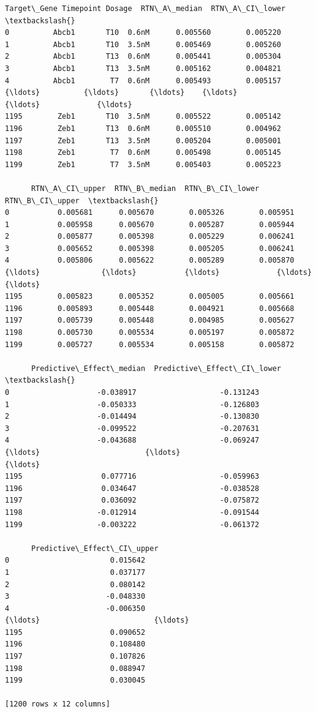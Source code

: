 \documentclass[11pt]{article}
\begin{document}
    
    \begin{Verbatim}[commandchars=\\\{\}]
     Target\_Gene Timepoint Dosage  RTN\_A\_median  RTN\_A\_CI\_lower  \textbackslash{}
0          Abcb1       T10  0.6nM      0.005560        0.005220   
1          Abcb1       T10  3.5nM      0.005469        0.005260   
2          Abcb1       T13  0.6nM      0.005441        0.005304   
3          Abcb1       T13  3.5nM      0.005162        0.004821   
4          Abcb1        T7  0.6nM      0.005493        0.005157   
{\ldots}          {\ldots}       {\ldots}    {\ldots}           {\ldots}             {\ldots}   
1195        Zeb1       T10  3.5nM      0.005522        0.005142   
1196        Zeb1       T13  0.6nM      0.005510        0.004962   
1197        Zeb1       T13  3.5nM      0.005204        0.005001   
1198        Zeb1        T7  0.6nM      0.005498        0.005145   
1199        Zeb1        T7  3.5nM      0.005403        0.005223   

      RTN\_A\_CI\_upper  RTN\_B\_median  RTN\_B\_CI\_lower  RTN\_B\_CI\_upper  \textbackslash{}
0           0.005681      0.005670        0.005326        0.005951   
1           0.005958      0.005670        0.005287        0.005944   
2           0.005877      0.005398        0.005229        0.006241   
3           0.005652      0.005398        0.005205        0.006241   
4           0.005806      0.005622        0.005289        0.005870   
{\ldots}              {\ldots}           {\ldots}             {\ldots}             {\ldots}   
1195        0.005823      0.005352        0.005005        0.005661   
1196        0.005893      0.005448        0.004921        0.005668   
1197        0.005739      0.005448        0.004985        0.005627   
1198        0.005730      0.005534        0.005197        0.005872   
1199        0.005727      0.005534        0.005158        0.005872   

      Predictive\_Effect\_median  Predictive\_Effect\_CI\_lower  \textbackslash{}
0                    -0.038917                   -0.131243   
1                    -0.050333                   -0.126803   
2                    -0.014494                   -0.130830   
3                    -0.099522                   -0.207631   
4                    -0.043688                   -0.069247   
{\ldots}                        {\ldots}                         {\ldots}   
1195                  0.077716                   -0.059963   
1196                  0.034647                   -0.038528   
1197                  0.036092                   -0.075872   
1198                 -0.012914                   -0.091544   
1199                 -0.003222                   -0.061372   

      Predictive\_Effect\_CI\_upper  
0                       0.015642  
1                       0.037177  
2                       0.080142  
3                      -0.048330  
4                      -0.006350  
{\ldots}                          {\ldots}  
1195                    0.090652  
1196                    0.108480  
1197                    0.107826  
1198                    0.088947  
1199                    0.030045  

[1200 rows x 12 columns]
    \end{Verbatim}
\end{document}
